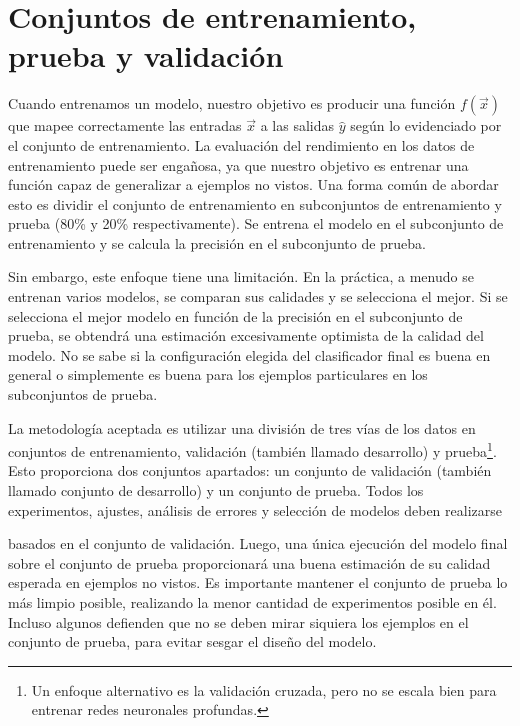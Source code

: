 \documentclass[11pt,fleqn]{book} %
\begin{document}
\section{Conjuntos de entrenamiento, prueba y validación}
Cuando entrenamos un modelo, nuestro objetivo es producir una función $f(\vec{x})$ que mapee correctamente las entradas $\vec{x}$ a las salidas $\hat{y}$ según lo evidenciado por el conjunto de entrenamiento. La evaluación del rendimiento en los datos de entrenamiento puede ser engañosa, ya que nuestro objetivo es entrenar una función capaz de generalizar a ejemplos no vistos. Una forma común de abordar esto es dividir el conjunto de entrenamiento en subconjuntos de entrenamiento y prueba (80\% y 20\% respectivamente). Se entrena el modelo en el subconjunto de entrenamiento y se calcula la precisión en el subconjunto de prueba.

Sin embargo, este enfoque tiene una limitación. En la práctica, a menudo se entrenan varios modelos, se comparan sus calidades y se selecciona el mejor. Si se selecciona el mejor modelo en función de la precisión en el subconjunto de prueba, se obtendrá una estimación excesivamente optimista de la calidad del modelo. No se sabe si la configuración elegida del clasificador final es buena en general o simplemente es buena para los ejemplos particulares en los subconjuntos de prueba.

La metodología aceptada es utilizar una división de tres vías de los datos en conjuntos de entrenamiento, validación (también llamado desarrollo) y prueba\footnote{Un enfoque alternativo es la validación cruzada, pero no se escala bien para entrenar redes neuronales profundas.}. Esto proporciona dos conjuntos apartados: un conjunto de validación (también llamado conjunto de desarrollo) y un conjunto de prueba. Todos los experimentos, ajustes, análisis de errores y selección de modelos deben realizarse

basados en el conjunto de validación. Luego, una única ejecución del modelo final sobre el conjunto de prueba proporcionará una buena estimación de su calidad esperada en ejemplos no vistos. Es importante mantener el conjunto de prueba lo más limpio posible, realizando la menor cantidad de experimentos posible en él. Incluso algunos defienden que no se deben mirar siquiera los ejemplos en el conjunto de prueba, para evitar sesgar el diseño del modelo.
\end{document}
